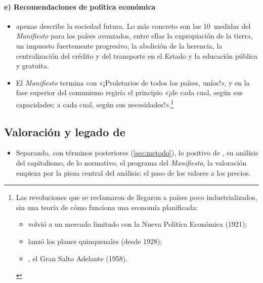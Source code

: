 \documentclass[11pt]{article}
\begin{document}
\paragraph{e) Recomendaciones de política económica}
\begin{itemize}
\item {} apenas describe la sociedad futura. Lo más concreto son las 10~medidas del \emph{Manifiesto} para los países avanzados, entre ellas la expropiación de la tierra, un impuesto fuertemente progresivo, la abolición de la herencia, la centralización del crédito y del transporte en el Estado y la educación pública y gratuita\nocite{MarxEngels1848Manifest}.
\item El \emph{Manifiesto} termina con «¡Proletarios de todos los países, uníos!», y en la fase superior del comunismo regiría el principio «¡de cada cual, según sus capacidades; a cada cual, según sus necesidades!»\nocite{Marx1875Gotha}.\footnote{Las revoluciones que se reclamaron de  llegaron a países poco industrializados, sin una teoría de cómo funciona una economía planificada:
\begin{itemize}
\item {} volvió a un mercado limitado con la Nueva Política Económica (1921);
\item {} lanzó los planes quinquenales (desde 1928);
\item {}, el Gran Salto Adelante (1958).
\end{itemize}}
\end{itemize}

\subsection{Valoración y legado de }\label{sec:marx-valoracion}

\begin{itemize}
\item Separando, con términos posteriores (\ref{sec:metodo}), lo positivo de , su análisis del capitalismo, de lo normativo, el programa del \emph{Manifiesto}, la valoración empieza por la pieza central del análisis: el paso de los valores a los precios.
\end{itemize}
\end{document}
